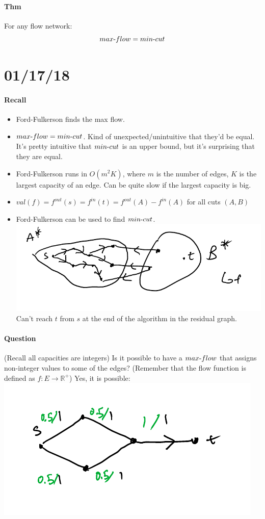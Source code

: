 \documentclass[12 pt]{article}
\begin{document}
        \paragraph{Thm} For any flow network:
        $$max\hbox{-}flow = min\hbox{-}cut$$
        \section{01/17/18}
        \paragraph{Recall}
        \begin{itemize}
        \item Ford-Fulkerson finds the max flow. 
        \item $max\hbox{-}flow=min\hbox{-}cut$. Kind of unexpected/unintuitive that
          they'd be equal. It's pretty intuitive that $min\hbox{-}cut$ is an
          upper bound, but it's surprising that they are equal.
        \item Ford-Fulkerson runs in $O(m^2K)$, where $m$ is the
          number of edges, $K$ is the
          largest capacity of an edge. Can be quite slow if the
          largest capacity is big.
        \item $val(f) =f^{out}(s)=f^{in}(t)=f^{out}(A)-f^{in}(A)$ for
          all cuts $(A,B)$
        \item Ford-Fulkerson can be used to find $min\hbox{-}cut$.
          \\ \includegraphics[width=.9\textwidth]{i35.pdf}
          Can't reach $t$ from $s$ at the end of the algorithm in the
          residual graph.
        \end{itemize}
        \paragraph{Question} (Recall all capacities are integers) Is
        it possible to have a $max\hbox{-}flow$ that assigns non-integer
        values to some of the edges? (Remember that the flow function
        is defined as $f:E \to \mathbb{R}^+$) Yes, it is possible:
        \\ \includegraphics[width=.9\textwidth]{i36.pdf}
\end{document}
